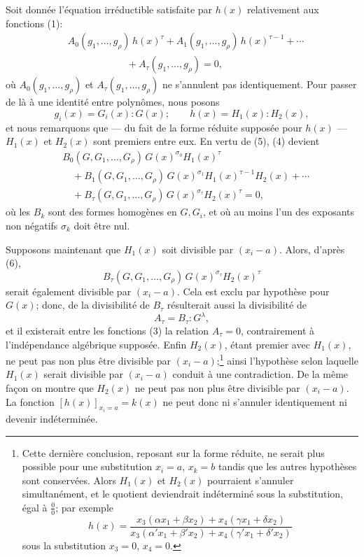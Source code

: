 \documentclass[11pt]{article}
\begin{document}
Soit donnée l'équation irréductible satisfaite par $h(x)$ relativement aux fonctions (1):
\begin{equation}
\begin{aligned}
&A_0(g_1,\ldots,g_\rho)\,h(x)^\tau
 +A_1(g_1,\ldots,g_\rho)\,h(x)^{\tau-1}
 +\cdots \\
&\hspace{6em}+A_\tau(g_1,\ldots,g_\rho)=0,
\end{aligned}
\tag{4}
\end{equation}
où $A_0(g_1,\ldots,g_\rho)$ et $A_\tau(g_1,\ldots,g_\rho)$ ne s'annulent pas identiquement. Pour passer de là à une identité entre polynômes, nous posons
\begin{equation}
  g_i(x)=G_i(x):G(x);\qquad h(x)=H_1(x):H_2(x),
\tag{5}
\end{equation}
et nous remarquons que --- du fait de la forme réduite supposée pour $h(x)$ --- $H_1(x)$ et $H_2(x)$ sont premiers entre eux. En vertu de (5), (4) devient
\begin{equation}
\begin{aligned}
&B_0(G,G_1,\ldots,G_\rho)\,G(x)^{\sigma_0}H_1(x)^\tau \\
&\quad+B_1(G,G_1,\ldots,G_\rho)\,G(x)^{\sigma_1}H_1(x)^{\tau-1}H_2(x)+\cdots \\
&\quad+B_\tau(G,G_1,\ldots,G_\rho)\,G(x)^{\sigma_\tau}H_2(x)^\tau=0,
\end{aligned}
\tag{6}
\end{equation}
où les $B_k$ sont des formes homogènes en $G,G_i$, et où au moins l'un des exposants non négatifs $\sigma_k$ doit être nul.

Supposons maintenant que $H_1(x)$ soit divisible par $(x_i-a)$. Alors, d'après (6),
\[
  B_\tau(G,G_1,\ldots,G_\rho)\,G(x)^{\sigma_\tau}H_2(x)^\tau
\]
serait également divisible par $(x_i-a)$. Cela est exclu par hypothèse pour $G(x)$; donc, de la divisibilité de $B_\tau$ résulterait aussi la divisibilité de
\[
  A_\tau=B_\tau:G^\lambda,
\]
et il existerait entre les fonctions (3) la relation $A_\tau=0$, contrairement à l'indépendance algébrique supposée. Enfin $H_2(x)$, étant premier avec $H_1(x)$, ne peut pas non plus être divisible par $(x_i-a)$;\footnote{Cette dernière conclusion, reposant sur la forme réduite, ne serait plus possible pour une substitution $x_i=a$, $x_k=b$ tandis que les autres hypothèses sont conservées. Alors $H_1(x)$ et $H_2(x)$ pourraient s'annuler simultanément, et le quotient deviendrait indéterminé sous la substitution, égal à $\frac{0}{0}$; par exemple
\[
 h(x)=\frac{x_3(\alpha x_1+\beta x_2)+x_4(\gamma x_1+\delta x_2)}
 {x_3(\alpha' x_1+\beta' x_2)+x_4(\gamma' x_1+\delta' x_2)}
\]
sous la substitution $x_3=0$, $x_4=0$.} ainsi l'hypothèse selon laquelle $H_1(x)$ serait divisible par $(x_i-a)$ conduit à une contradiction. De la même façon on montre que $H_2(x)$ ne peut pas non plus être divisible par $(x_i-a)$. La fonction $[h(x)]_{x_i=a}=k(x)$ ne peut donc ni s'annuler identiquement ni devenir indéterminée.
\end{document}
